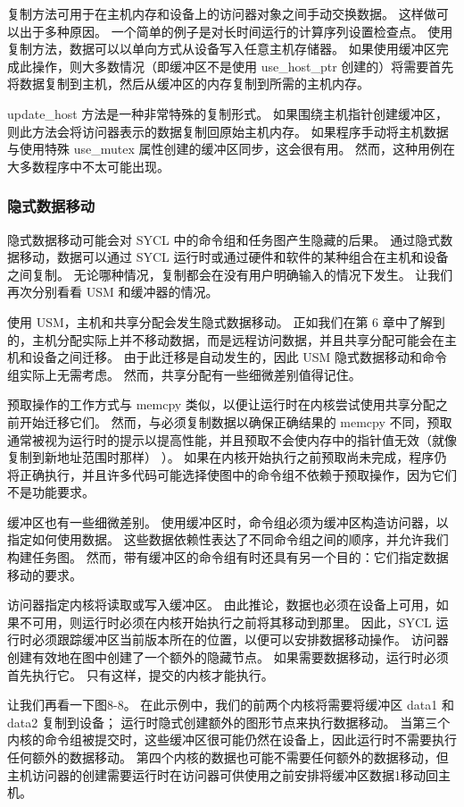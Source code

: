 复制方法可用于在主机内存和设备上的访问器对象之间手动交换数据。 这样做可以出于多种原因。 一个简单的例子是对长时间运行的计算序列设置检查点。 使用复制方法，数据可以以单向方式从设备写入任意主机存储器。 如果使用缓冲区完成此操作，则大多数情况（即缓冲区不是使用 use\_host\_ptr 创建的）将需要首先将数据复制到主机，然后从缓冲区的内存复制到所需的主机内存。

update\_host 方法是一种非常特殊的复制形式。 如果围绕主机指针创建缓冲区，则此方法会将访问器表示的数据复制回原始主机内存。 如果程序手动将主机数据与使用特殊 use\_mutex 属性创建的缓冲区同步，这会很有用。 然而，这种用例在大多数程序中不太可能出现。

\subsubsection{隐式数据移动}
隐式数据移动可能会对 SYCL 中的命令组和任务图产生隐藏的后果。 通过隐式数据移动，数据可以通过 SYCL 运行时或通过硬件和软件的某种组合在主机和设备之间复制。 无论哪种情况，复制都会在没有用户明确输入的情况下发生。 让我们再次分别看看 USM 和缓冲器的情况。

使用 USM，主机和共享分配会发生隐式数据移动。 正如我们在第 6 章中了解到的，主机分配实际上并不移动数据，而是远程访问数据，并且共享分配可能会在主机和设备之间迁移。 由于此迁移是自动发生的，因此 USM 隐式数据移动和命令组实际上无需考虑。 然而，共享分配有一些细微差别值得记住。

预取操作的工作方式与 memcpy 类似，以便让运行时在内核尝试使用共享分配之前开始迁移它们。 然而，与必须复制数据以确保正确结果的 memcpy 不同，预取通常被视为运行时的提示以提高性能，并且预取不会使内存中的指针值无效（就像复制到新地址范围时那样） ）。 如果在内核开始执行之前预取尚未完成，程序仍将正确执行，并且许多代码可能选择使图中的命令组不依赖于预取操作，因为它们不是功能要求。

缓冲区也有一些细微差别。 使用缓冲区时，命令组必须为缓冲区构造访问器，以指定如何使用数据。 这些数据依赖性表达了不同命令组之间的顺序，并允许我们构建任务图。 然而，带有缓冲区的命令组有时还具有另一个目的：它们指定数据移动的要求。

访问器指定内核将读取或写入缓冲区。 由此推论，数据也必须在设备上可用，如果不可用，则运行时必须在内核开始执行之前将其移动到那里。 因此，SYCL 运行时必须跟踪缓冲区当前版本所在的位置，以便可以安排数据移动操作。 访问器创建有效地在图中创建了一个额外的隐藏节点。 如果需要数据移动，运行时必须首先执行它。 只有这样，提交的内核才能执行。

让我们再看一下图8-8。 在此示例中，我们的前两个内核将需要将缓冲区 data1 和 data2 复制到设备； 运行时隐式创建额外的图形节点来执行数据移动。 当第三个内核的命令组被提交时，这些缓冲区很可能仍然在设备上，因此运行时不需要执行任何额外的数据移动。 第四个内核的数据也可能不需要任何额外的数据移动，但主机访问器的创建需要运行时在访问器可供使用之前安排将缓冲区数据1移动回主机。

